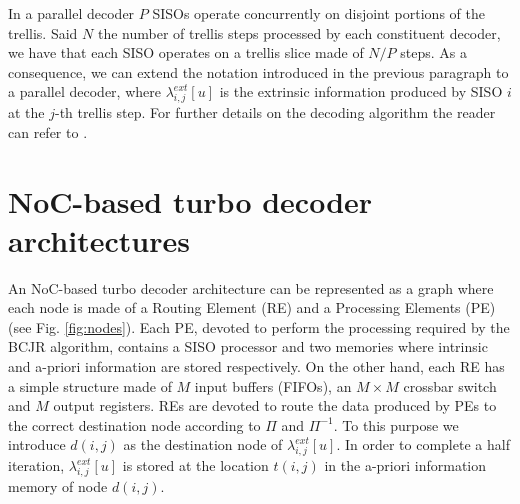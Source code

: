 \documentclass[10pt,twocolumn,journal]{IEEEtran}
\begin{document}
In a parallel decoder $P$ SISOs operate concurrently on disjoint portions of 
the trellis. Said $N$ the number of trellis steps processed by each constituent decoder, we have that each SISO  
operates on a trellis slice made of $N/P$ steps. As a consequence, we can extend the notation introduced in the previous 
paragraph to a parallel decoder, where $\lambda^{ext}_{i,j}[u]$ is the extrinsic information produced by SISO $i$ at the  
$j$-th trellis step. 
For further details on the decoding algorithm the reader can refer to \cite{montorsi_IEEEProc07}.

\section{NoC-based turbo decoder architectures}
\label{sec:noc}

An NoC-based turbo decoder architecture can be represented as a graph where each node is 
made of a Routing Element (RE) and a Processing Elements (PE) (see Fig. \ref{fig:nodes}).
Each PE, devoted to perform the processing required 
by the BCJR algorithm, contains a SISO processor and two memories where 
intrinsic and a-priori information are stored respectively. On the other hand, each RE has a simple structure made of 
$M$ input buffers (FIFOs), an $M\times M$ crossbar switch and $M$ output registers. 
REs are devoted to route the data produced by PEs to the correct destination node according to $\Pi$ and 
$\Pi^{-1}$. To this purpose we introduce $d(i,j)$ as the destination node of $\lambda^{ext}_{i,j}[u]$. 
In order to complete a half iteration, $\lambda^{ext}_{i,j}[u]$ is stored at the location $t(i,j)$ in the 
a-priori information memory of node $d(i,j)$. 
\end{document}
